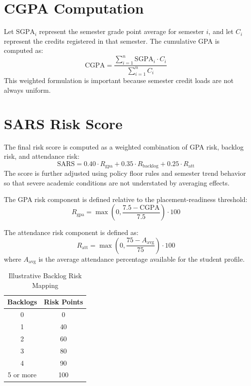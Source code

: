\section{CGPA Computation}
Let $\mathrm{SGPA}_i$ represent the semester grade point average for semester $i$, and let $C_i$ represent the credits registered in that semester. The cumulative GPA is computed as:
\begin{equation}
\mathrm{CGPA} = \frac{\sum_{i=1}^{n}\mathrm{SGPA}_i \cdot C_i}{\sum_{i=1}^{n} C_i}
\end{equation}
This weighted formulation is important because semester credit loads are not always uniform.

\section{SARS Risk Score}
The final risk score is computed as a weighted combination of GPA risk, backlog risk, and attendance risk:
\begin{equation}
\mathrm{SARS} = 0.40 \cdot R_{\mathrm{gpa}} + 0.35 \cdot R_{\mathrm{backlog}} + 0.25 \cdot R_{\mathrm{att}}
\end{equation}
The score is further adjusted using policy floor rules and semester trend behavior so that severe academic conditions are not understated by averaging effects.

The GPA risk component is defined relative to the placement-readiness threshold:
\begin{equation}
R_{\mathrm{gpa}} = \max \left(0, \frac{7.5 - \mathrm{CGPA}}{7.5} \right) \cdot 100
\end{equation}

The attendance risk component is defined as:
\begin{equation}
R_{\mathrm{att}} = \max \left(0, \frac{75 - A_{\mathrm{avg}}}{75} \right) \cdot 100
\end{equation}
where $A_{\mathrm{avg}}$ is the average attendance percentage available for the student profile.

\begin{table}[H]
\centering
\caption{Illustrative Backlog Risk Mapping}
\begin{tabular}{cc}
\toprule
\textbf{Backlogs} & \textbf{Risk Points} \\
\midrule
0 & 0 \\
1 & 40 \\
2 & 60 \\
3 & 80 \\
4 & 90 \\
5 or more & 100 \\
\bottomrule
\end{tabular}
\end{table}

